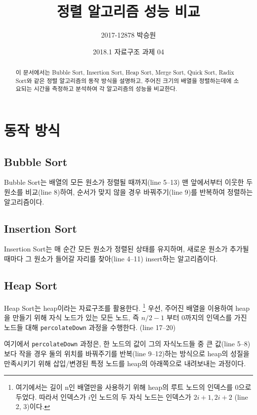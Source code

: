 \documentclass{article}
\title{정렬 알고리즘 성능 비교}
\date{%
	2018.1 자료구조 과제 04%
}
\author{%
2017-12878 박승원%
}
\begin{document}
	\maketitle
	\begin{abstract}
		이 문서에서는 Bubble Sort, Insertion Sort, Heap Sort, Merge Sort,
		Quick Sort, Radix Sort와 같은 정렬 알고리즘의 동작 방식을 설명하고,
		주어진 크기의 배열을 정렬하는데에 소요되는 시간을 측정하고 분석하여
		각 알고리즘의 성능을 비교한다.
	\end{abstract}

 	\section{동작 방식}
 	
 	\subsection{Bubble Sort}
 	Bubble Sort는 배열의 모든 원소가 정렬될 때까지(line 5--13)
 	맨 앞에서부터 이웃한 두 원소를 비교(line 8)하여,
 	순서가 맞지 않을 경우 바꿔주기(line 9)를 반복하여 정렬하는 알고리즘이다.
 	
	
	\subsection{Insertion Sort}
	Insertion Sort는 매 순간 모든 원소가 정렬된 상태를 유지하며,
	새로운 원소가 추가될 때마다 그 원소가 들어갈 자리를 찾아(line 4--11)
	insert하는 알고리즘이다.
	
	
	\subsection{Heap Sort}
	Heap Sort는 heap이라는 자료구조를 활용한다.%
	\footnote{
		여기에서는 길이 n인 배열만을 사용하기 위해
		heap의 루트 노드의 인덱스를 0으로 두었다.
		따라서 인덱스가 $ i $인 노드의 두 자식 노드는
		인덱스가 $ 2i+1, 2i+2 $ (line 2, 3)이다.
	}
	우선, 주어진 배열을 이용하여 heap을 만들기 위해 
	자식 노드가 있는 모든 노드, 즉 $ n/2-1 $ 부터 0까지의
	인덱스를 가진 노드들 대해 \texttt{percolateDown}
	과정을 수행한다. (line 17--20)
	
	여기에서 \texttt{percolateDown} 과정은,
	한 노드의 값이 그의 자식노드들 중 큰 값(line 5--8)보다
	작을 경우 둘의 위치를 바꿔주기를 반복(line 9--12)하는 방식으로
	heap의 성질을 만족시키기 위해
	삽입/변경된 특정 노드를 heap의 아래쪽으로 내려보내는 과정이다.
	
\end{document}
